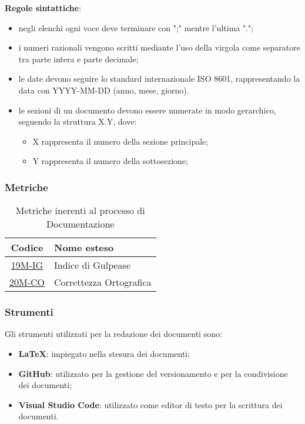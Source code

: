 \newpage
\textbf{Regole sintattiche}:
\begin{itemize}
	\item negli elenchi ogni voce deve terminare con ";" mentre l'ultima ".";
	\item i numeri razionali vengono scritti mediante l'uso della virgola come separatore tra parte intera e parte decimale;
	\item le date devono seguire lo standard internazionale ISO 8601, rappresentando la data con YYYY-MM-DD (anno, mese, giorno).
	\item le sezioni di un documento devono essere numerate in modo gerarchico, seguendo la struttura X.Y, dove:
	      \begin{itemize}
		      \item X rappresenta il numero della sezione principale;
		      \item Y rappresenta il numero della sottosezione;
	      \end{itemize}
\end{itemize}

\subsubsection{Metriche}

\begin{table}[!h]
	\centering
	\begin{tabular}{|c|l|}
		\hline
		\textbf{Codice} & \textbf{Nome esteso}               					\\
		\hline
		\underline{\hyperlink{19M}{19M-IG}}     & Indice di Gulpease   			\\
		\underline{\hyperlink{20M}{20M-CO}}     & Correttezza Ortografica  		\\
		\hline
	\end{tabular}
	\caption{Metriche inerenti al processo di Documentazione}
\end{table}

\subsubsection{Strumenti}
Gli strumenti utilizzati per la redazione dei documenti sono:
\begin{itemize}
	\item \textbf{LaTeX}: impiegato nella stesura dei documenti;
	\item \textbf{GitHub}: utilizzato per la gestione del versionamento e per la condivisione dei documenti;
	\item \textbf{Visual Studio Code}: utilizzato come editor di testo per la scrittura dei documenti.
\end{itemize}




